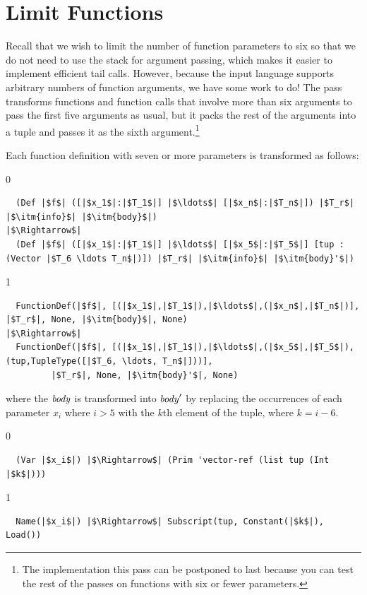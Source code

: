 \documentclass[7x10]{TimesAPriori_MIT}%
\def\racketEd{0}
\def\pythonEd{1}
\def\edition{1}
\newcommand{\pythonColor}[0]{}
\numberwithin{theorem}{chapter}
\numberwithin{definition}{chapter}
\numberwithin{equation}{chapter}
\begin{document}
\section{Limit Functions}
\label{sec:limit-functions-r4}

Recall that we wish to limit the number of function parameters to six
so that we do not need to use the stack for argument passing, which
makes it easier to implement efficient tail calls.  However, because
the input language \LangFun{} supports arbitrary numbers of function
arguments, we have some work to do! The  pass
transforms functions and function calls that involve more than six
arguments to pass the first five arguments as usual, but it packs the
rest of the arguments into a tuple and passes it as the sixth
argument.\footnote{The implementation this pass can be postponed to
  last because you can test the rest of the passes on functions with
  six or fewer parameters.}

Each function definition with seven or more parameters is transformed as
follows:
{\if\edition\racketEd   
\begin{lstlisting}
  (Def |$f$| ([|$x_1$|:|$T_1$|] |$\ldots$| [|$x_n$|:|$T_n$|]) |$T_r$| |$\itm{info}$| |$\itm{body}$|) 
|$\Rightarrow$|
  (Def |$f$| ([|$x_1$|:|$T_1$|] |$\ldots$| [|$x_5$|:|$T_5$|] [tup : (Vector |$T_6 \ldots T_n$|)]) |$T_r$| |$\itm{info}$| |$\itm{body}'$|) 
\end{lstlisting}
\fi}
{\if\edition\pythonEd\pythonColor   
\begin{lstlisting}
  FunctionDef(|$f$|, [(|$x_1$|,|$T_1$|),|$\ldots$|,(|$x_n$|,|$T_n$|)], |$T_r$|, None, |$\itm{body}$|, None)
|$\Rightarrow$|
  FunctionDef(|$f$|, [(|$x_1$|,|$T_1$|),|$\ldots$|,(|$x_5$|,|$T_5$|),(tup,TupleType([|$T_6, \ldots, T_n$|]))],
         |$T_r$|, None, |$\itm{body}'$|, None)
\end{lstlisting}
\fi}
%
\noindent where the $\mathit{body}$ is transformed into $\mathit{body}'$ by
replacing the occurrences of each parameter $x_i$ where $i > 5$ with
the $k$th element of the tuple, where $k = i - 6$.
%
{\if\edition\racketEd
\begin{lstlisting}
  (Var |$x_i$|) |$\Rightarrow$| (Prim 'vector-ref (list tup (Int |$k$|)))
\end{lstlisting}
\fi}
{\if\edition\pythonEd\pythonColor   
\begin{lstlisting}
  Name(|$x_i$|) |$\Rightarrow$| Subscript(tup, Constant(|$k$|), Load())
\end{lstlisting}
\fi}
\end{document}
